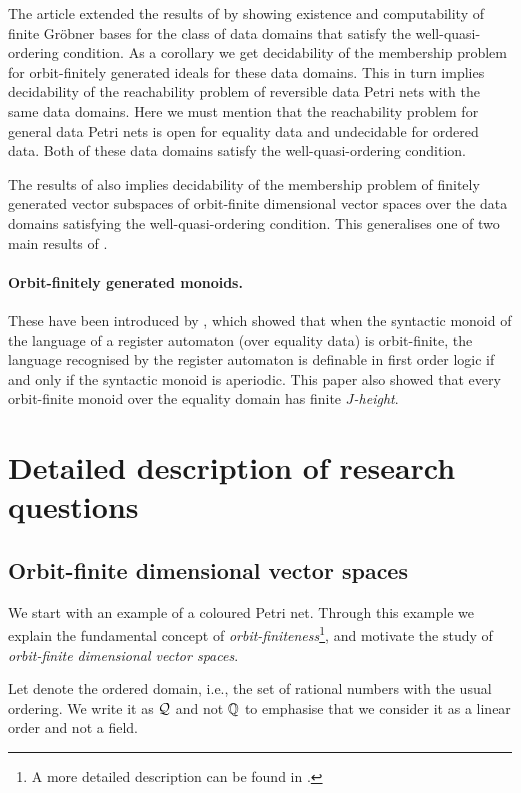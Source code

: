 \documentclass[a4paper,11pt]{article}
\begin{document}
The article  extended the results of  by showing existence and computability of finite Gr\"{o}bner bases for the class of data domains that satisfy the well-quasi-ordering condition.
As a corollary we get decidability of the membership problem for orbit-finitely generated ideals for these data domains.
This in turn implies decidability of the reachability problem of reversible data Petri nets with the same data domains.
Here we must mention that the reachability problem for general data Petri nets is open for equality data and undecidable for ordered data.
Both of these data domains satisfy the well-quasi-ordering condition.


The results of  also implies decidability of the membership problem of finitely generated vector subspaces of orbit-finite dimensional vector spaces over the data domains satisfying the well-quasi-ordering condition.
This generalises one of two main results of .
%
\paragraph*{Orbit-finitely generated monoids.}
These have been introduced by \cite{nomMon},
which showed that when the syntactic monoid of the language of a register automaton (over equality data) is orbit-finite,
the language recognised by the register automaton is definable in first order logic if and only if the syntactic monoid is aperiodic.
This paper also showed that every orbit-finite monoid over the equality domain has finite \emph{$J$-height}.
%
\section{Detailed description of research questions}
%
\subsection{Orbit-finite dimensional vector spaces}\label{sec:ofvsp}
%
We start with an example of a coloured Petri net.
Through this example we explain the fundamental concept of \emph{orbit-finiteness}\footnote{A more detailed description can be found in \cite[Chapter 3]{atombook}.},
and motivate the study of \emph{orbit-finite dimensional vector spaces}.

Let \emphdef{$\dloQ$} denote the ordered domain,
i.e., the set of rational numbers with the usual ordering.
We write it as $\dloQ$ and not $\mathbb{Q}$ to emphasise that we consider it as a linear order and not a field.
\end{document}
